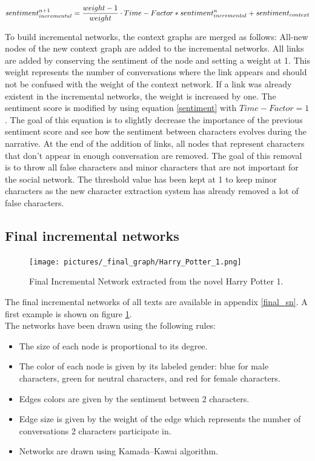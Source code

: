 \documentclass[a4paper, 12pt]{report}
\begin{document}
\begin{equation}
sentiment_{incremental}^{n+1} = \frac{weight - 1}{weight} \cdot Time-Factor * sentiment_{incremental}^{n} + sentiment_{context}\\
\label{sentiment}
\end{equation}

To build incremental networks, the context graphs are merged as follows: All-new nodes of the new context graph are added to the incremental networks.
All links are added by conserving the sentiment of the node and setting a weight at 1. This weight represents the number of conversations where the link appears and should not be confused with the weight of the context network. If a link was already existent in the incremental networks, the weight is increased by one.
The sentiment score is modified by using equation \ref{sentiment} with $Time-Factor = 1$.
The goal of this equation is to slightly decrease the importance of the previous sentiment score and see how the sentiment between characters evolves during the narrative.
At the end of the addition of links, all nodes that represent characters that don't appear in enough conversation are removed. The goal of this removal is to throw all false characters and minor characters that are not important for the social network. The threshold value has been kept at 1 to keep minor characters as the new character extraction system has already removed a lot of false characters.\\



\subsection{Final incremental networks}

\begin{figure}[h]
\centering
\texttt{[image: pictures/\_final\_graph/Harry\_Potter\_1.png]}
\caption{Final Incremental Network  extracted from the novel Harry Potter 1.}
\label{sn_harry}
\end{figure}

The final incremental networks of all texts are available in appendix \ref{final_sn}. A first example is shown on figure \ref{sn_harry}.\\
The networks have been drawn using the following rules:
\begin{itemize}
\item The size of each node is proportional to its degree.
\item The color of each node is given by its labeled gender: blue for male characters, green for neutral characters, and red for female characters.
\item Edges colors are given by the sentiment between 2 characters.
\item Edge size is given by the weight of the edge which represents the number of conversations 2 characters participate in.
\item Networks are drawn using Kamada–Kawai algorithm.
\end{itemize}
\end{document}
